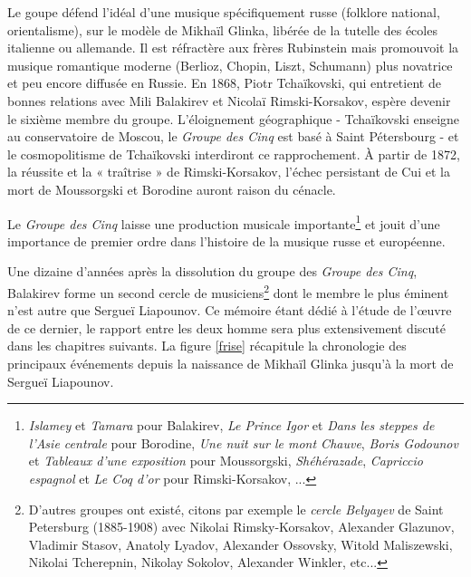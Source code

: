 Le goupe défend l'idéal d'une musique spécifiquement russe (folklore national, orientalisme), sur le modèle de Mikhaïl Glinka, libérée de la tutelle des écoles italienne ou allemande. Il est réfractère aux frères Rubinstein mais promouvoit la musique romantique moderne (Berlioz, Chopin, Liszt, Schumann) plus novatrice et peu encore diffusée en Russie. En 1868, Piotr Tchaïkovski, qui entretient de bonnes relations avec Mili Balakirev et Nicolaï Rimski-Korsakov, espère devenir le sixième membre du groupe. L'éloignement géographique - Tchaïkovski enseigne au conservatoire de Moscou, le \emph{Groupe des Cinq} est basé à Saint Pétersbourg - et le cosmopolitisme de Tchaïkovski interdiront ce rapprochement. À partir de 1872, la réussite et la « traîtrise » de Rimski-Korsakov, l'échec persistant de Cui et la mort de Moussorgski et Borodine auront raison du cénacle.

Le \emph{Groupe des Cinq} laisse une production musicale importante\footnote{\emph{Islamey} et \emph{Tamara} pour Balakirev, \emph{Le Prince Igor} et \emph{Dans les steppes de l'Asie centrale} pour Borodine, \emph{Une nuit sur le mont Chauve}, \emph{Boris Godounov} et \emph{Tableaux d'une exposition} pour Moussorgski, \emph{Shéhérazade}, \emph{Capriccio espagnol} et \emph{Le Coq d'or} pour Rimski-Korsakov, ...} et jouit d'une importance de premier ordre dans l'histoire de la musique russe et européenne.

Une dizaine d'années après la dissolution du groupe des \emph{Groupe des Cinq}, Balakirev forme un second cercle de musiciens\footnote{D'autres groupes ont existé, citons par exemple le \emph{cercle Belyayev} de Saint Petersburg (1885-1908) avec Nikolai Rimsky-Korsakov, Alexander Glazunov, Vladimir Stasov, Anatoly Lyadov, Alexander Ossovsky, Witold Maliszewski, Nikolai Tcherepnin, Nikolay Sokolov, Alexander Winkler, etc... } dont le membre le plus éminent n'est autre que Sergueï Liapounov. Ce mémoire étant dédié à l'étude de l'œuvre de ce dernier, le rapport entre les deux homme sera plus extensivement discuté dans les chapitres suivants. La figure \ref{frise} récapitule la chronologie des principaux événements depuis la naissance de Mikhaïl Glinka jusqu'à la mort de Sergueï Liapounov.

